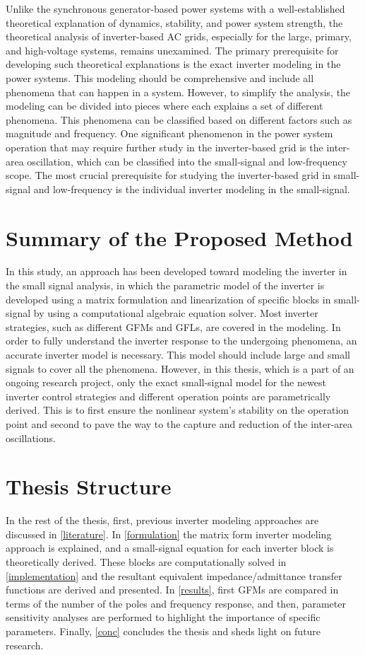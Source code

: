 Unlike the synchronous generator-based power systems with a well-established theoretical explanation of dynamics, stability, and power system strength, the theoretical analysis of inverter-based AC grids, especially for the large, primary, and high-voltage systems, remains unexamined. The primary prerequisite for developing such theoretical explanations is the exact inverter modeling in the power systems. This modeling should be comprehensive and include all phenomena that can happen in a system. However, to simplify the analysis, the modeling can be divided into pieces where each explains a set of different phenomena. This phenomena can be classified based on different factors such as magnitude and frequency. One significant phenomenon in the power system operation that may require further study in the inverter-based grid is the inter-area oscillation, which can be classified into the small-signal and low-frequency scope. The most crucial prerequisite for studying the inverter-based grid in small-signal and low-frequency is the individual inverter modeling in the small-signal. 

\section{Summary of the Proposed Method}

In this study, an approach has been developed toward modeling the inverter in the small signal analysis, in which the parametric model of the inverter is developed using a matrix formulation and linearization of specific blocks in small-signal by using a computational algebraic equation solver. Most inverter strategies, such as different \gls{GFM}s and \gls{GFL}s, are covered in the modeling.
In order to fully understand the inverter response to the undergoing phenomena, an accurate inverter model is necessary. This model should include large and small signals to cover all the phenomena. However, in this thesis, which is a part of an ongoing research project, only the exact small-signal model for the newest inverter control strategies and different operation points are parametrically derived. This is to first ensure the nonlinear system's stability on the operation point and second to pave the way to the capture and reduction of the inter-area oscillations.

\section{Thesis Structure}

In the rest of the thesis, first, previous inverter modeling approaches are discussed in  \ref{literature}. In \ref{formulation} the matrix form inverter modeling approach is explained, and a small-signal equation for each inverter block is theoretically derived. These blocks are computationally solved in \ref{implementation} and the resultant equivalent impedance/admittance transfer functions are derived and presented. In \ref{results}, first \gls{GFM}s are compared in terms of the number of the poles and frequency response, and then, parameter sensitivity analyses are performed to highlight the importance of specific parameters. Finally, \ref{conc} concludes the thesis and sheds light on future research.